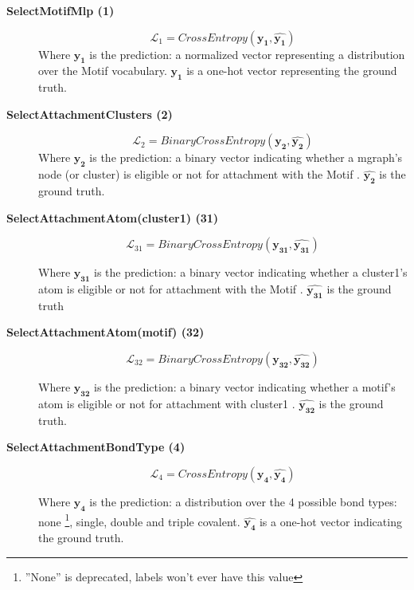 \documentclass{article}
\begin{document}
\begin{description}
\item[\textbf{SelectMotifMlp (1)}]
\begin{equation}
    \mathcal{L}_1 = CrossEntropy(\boldsymbol{y_1}, \boldsymbol{\hat{y_1}})
\end{equation}
Where $\boldsymbol{y_1}$ is the prediction: a normalized vector representing a distribution over the Motif vocabulary.
$\boldsymbol{\hat{y_1}}$ is a one-hot vector representing the ground truth.

\item[\textbf{SelectAttachmentClusters (2)}]
\begin{equation}
    \mathcal{L}_2 = BinaryCrossEntropy(\boldsymbol{y_2}, \boldsymbol{\hat{y_2}})
\end{equation}
Where $\boldsymbol{y_2}$ is the prediction: a binary vector indicating whether a mgraph's node (or cluster) is eligible or not for attachment with the Motif \footnotemark[\value{footnote}].
$\boldsymbol{\hat{y_2}}$ is the ground truth.

\item[\textbf{SelectAttachmentAtom(cluster1) (31)}]
\begin{equation}
    \mathcal{L}_{31} = BinaryCrossEntropy(\boldsymbol{y_{31}}, \boldsymbol{\hat{y_{31}}})
\end{equation}

Where $\boldsymbol{y_{31}}$ is the prediction: a binary vector indicating whether a cluster1's atom is eligible or not for attachment with the Motif \footnotemark[\value{footnote}].
$\boldsymbol{\hat{y_{31}}}$ is the ground truth


\item[\textbf{SelectAttachmentAtom(motif) (32)}]
\begin{equation}
    \mathcal{L}_{32} = BinaryCrossEntropy(\boldsymbol{y_{32}}, \boldsymbol{\hat{y_{32}}})
\end{equation}

Where $\boldsymbol{y_{32}}$ is the prediction: a binary vector indicating whether a motif's atom is eligible or not for attachment with cluster1 \footnotemark{\value{footnote}}.
$\boldsymbol{\hat{y_{32}}}$ is the ground truth.


\item[\textbf{SelectAttachmentBondType (4)}]
\begin{equation}
    \mathcal{L}_4 = CrossEntropy(\boldsymbol{y_4}, \boldsymbol{\hat{y_4}})
\end{equation}

Where $\boldsymbol{y_{4}}$ is the prediction: a distribution over the 4 possible bond types: none \footnote{''None'' is deprecated, labels won't ever have this value}, single, double and triple covalent.
$\boldsymbol{\hat{y_{4}}}$ is a one-hot vector indicating the ground truth.

\end{description}
\end{document}
